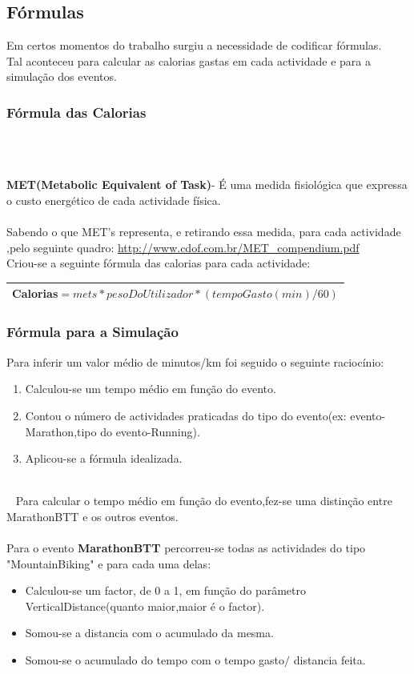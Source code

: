 \documentclass[10pt,notitlepage]{article}
\begin{document}
\subsection{Fórmulas}
Em certos momentos do trabalho surgiu a necessidade de codificar fórmulas.\\
Tal aconteceu para calcular as calorias gastas em cada actividade e para a simulação dos eventos.

\subsubsection{Fórmula das Calorias}

~\\~

\textbf{MET(Metabolic Equivalent of Task)}- É  uma medida fisiológica que expressa o custo energético de cada actividade física.\\~\\


Sabendo o que MET's representa, e retirando essa medida, para cada actividade ,pelo seguinte quadro: \url{http://www.cdof.com.br/MET_compendium.pdf}\\
Criou-se a seguinte fórmula das calorias para cada actividade:\\

\begin{tabular}{|r|}
  \hline
 \textbf{Calorias}$=mets * pesoDoUtilizador * (tempoGasto(min) / 60)$\\
 \hline \hline
\end{tabular}


\subsubsection{Fórmula para a Simulação}

Para inferir um valor médio de minutos/km foi seguido o seguinte raciocínio:\\
\begin{enumerate}
\item Calculou-se um tempo médio em função do evento.
\item Contou o número de actividades praticadas do tipo do evento(ex: evento-Marathon,tipo do evento-Running).
\item Aplicou-se a fórmula idealizada. 
\end{enumerate}
~\\~
Para calcular o tempo médio em função do evento,fez-se uma distinção entre MarathonBTT e os outros eventos.\\~\\
Para o evento \textbf{MarathonBTT} percorreu-se todas as actividades do tipo "MountainBiking" e para cada uma delas:
\begin{itemize}
\item Calculou-se um factor, de 0 a 1, em função do parâmetro VerticalDistance(quanto maior,maior é o factor).
\item Somou-se a distancia com o acumulado da mesma.
\item Somou-se o acumulado do tempo com o tempo gasto$/$ distancia feita. 
\end{itemize}
\end{document}
